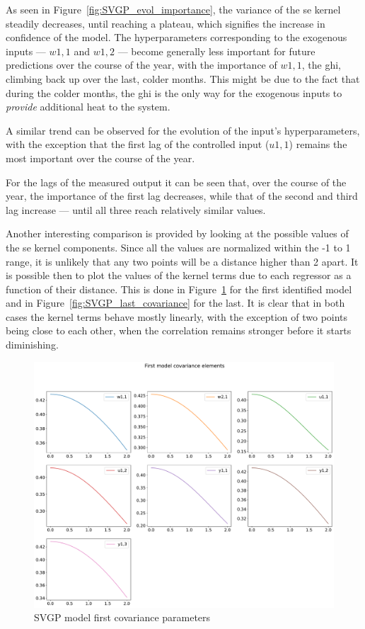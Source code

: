 As seen in Figure~\ref{fig:SVGP_evol_importance}, the variance of the
\acrshort{se} kernel steadily decreases, until reaching a plateau, which
signifies the increase in confidence of the model. The hyperparameters
corresponding to the exogenous inputs --- $w1,1$ and $w1,2$ --- become generally
less important for future predictions over the course of the year, with the
importance of $w1,1$, the \acrlong{ghi}, climbing back up over the last, colder
months. This might be due to the fact that during the colder months, the
\acrshort{ghi} is the only way for the exogenous inputs to \textit{provide}
additional heat to the system.

A similar trend can be observed for the evolution of the input's
hyperparameters, with the exception that the first lag of the controlled input
($u1,1$) remains the most important over the course of the year.

For the lags of the measured output it can be seen that, over the course of the
year, the importance of the first lag decreases, while that of the second and
third lag increase --- until all three reach relatively similar values.

Another interesting comparison is provided by looking at the possible values of
the \acrshort{se} kernel components. Since all the values are normalized within
the -1 to 1 range, it is unlikely that any two points will be a distance higher
than 2 apart. It is possible then to plot the values of the kernel terms due to
each regressor as a function of their distance. This is done in
Figure~\ref{fig:SVGP_first_covariance} for the first identified model and in
Figure~\ref{fig:SVGP_last_covariance} for the last. It is clear that in both
cases the kernel terms behave mostly linearly, with the exception of two points
being close to each other, when the correlation remains stronger before it
starts diminishing.

\begin{figure}[ht]
    \centering
    \includegraphics[width =
    \textwidth]{Plots/1_SVGP_480pts_inf_window_12_averageYear_first_covariance.pdf}
    \caption{SVGP model first covariance parameters}
    \label{fig:SVGP_first_covariance}
\end{figure}

